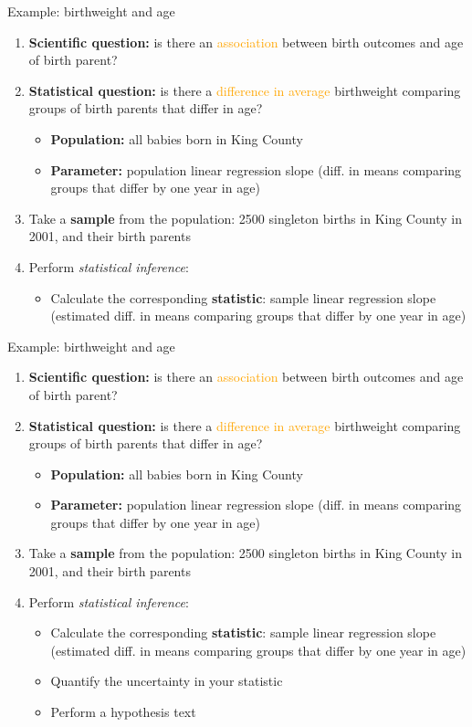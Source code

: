 \documentclass[10pt,t]{beamer}
\begin{document}
\begin{frame}{Example: birthweight and age}
\begin{enumerate}
	\item \textbf{Scientific question:} is there an \textcolor{orange}{association} between birth outcomes and age of birth parent?
	\item \textbf{Statistical question:} is there a \textcolor{orange}{difference in average} birthweight comparing groups of birth parents that differ in age?
	\begin{itemize}
		\item \textbf{Population:} all babies born in King County
		\item \textbf{Parameter:} population linear regression slope (diff. in means comparing groups that differ by one year in age)
	\end{itemize}
	\item Take a \textbf{sample} from the population: 2500 singleton births in King County in 2001, and their birth parents
	\item Perform \textit{statistical inference}:
	\begin{itemize}
		\item Calculate the corresponding \textbf{statistic}: sample linear regression slope (estimated diff. in means comparing groups that differ by one year in age)
	\end{itemize}
\end{enumerate}
\end{frame}

\begin{frame}{Example: birthweight and age}
\begin{enumerate}
	\item \textbf{Scientific question:} is there an \textcolor{orange}{association} between birth outcomes and age of birth parent?
	\item \textbf{Statistical question:} is there a \textcolor{orange}{difference in average} birthweight comparing groups of birth parents that differ in age?
	\begin{itemize}
		\item \textbf{Population:} all babies born in King County
		\item \textbf{Parameter:} population linear regression slope (diff. in means comparing groups that differ by one year in age)
	\end{itemize}
	\item Take a \textbf{sample} from the population: 2500 singleton births in King County in 2001, and their birth parents
	\item Perform \textit{statistical inference}:
	\begin{itemize}
		\item Calculate the corresponding \textbf{statistic}: sample linear regression slope (estimated diff. in means comparing groups that differ by one year in age)
		\item Quantify the uncertainty in your statistic
		\item Perform a hypothesis text
	\end{itemize}
\end{enumerate}
\end{frame}
\end{document}
